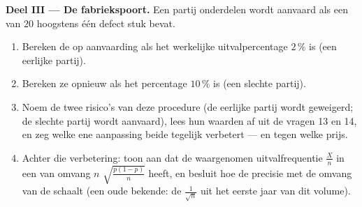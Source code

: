 \begin{problem}
\medskip
\noindent\textbf{Deel III --- De fabriekspoort.}
Een partij onderdelen wordt aanvaard als een  van $20$ hoogstens één
defect stuk bevat.
\begin{enumerate}[resume]
  \item Bereken de  op aanvaarding als het werkelijke uitvalpercentage
        $2\,\%$ is (een eerlijke partij).
  \item Bereken ze opnieuw als het percentage $10\,\%$ is (een slechte
        partij).
  \item Noem de twee risico's van deze procedure (de eerlijke partij wordt
        geweigerd; de slechte partij wordt aanvaard), lees hun waarden af uit
        de vragen 13 en 14, en zeg welke ene aanpassing beide tegelijk
        verbetert --- en tegen welke prijs.
  \item Achter die verbetering: toon aan dat de waargenomen uitvalfrequentie
        $\frac Xn$ in een  van omvang $n$ 
        $\sqrt{\frac{p(1-p)}{n}}$ heeft, en besluit hoe de precisie met de
        omvang van de  schaalt (een oude bekende: de
        $\frac{1}{\sqrt n}$ uit het eerste jaar van dit volume).
\end{enumerate}


\end{problem}
